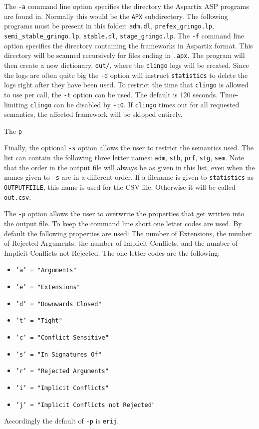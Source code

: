 \documentclass[parskip=half]{scrartcl}
\begin{document}
The \texttt{-a} command line option specifies the directory the Aspartix ASP
programs are found in. Normally this would be the \texttt{APX\/} subdirectory.
The following programs must be present in this folder: \texttt{adm.dl},
\texttt{prefex\_gringo.lp}, \texttt{semi\_stable\_gringo.lp},
\texttt{stable.dl}, \texttt{stage\_gringo.lp}.  The \texttt{-f} command line
option specifies the directory containing the frameworks in Aspartix format.
This directory will be scanned recursively for files ending
in \texttt{.apx}. The program will then create a new
dictionary, \texttt{out/}, where the \texttt{clingo} logs will be created.
Since the logs are often quite big the \texttt{-d} option will instruct
\texttt{statistics} to delete the logs right after they have been used.
To restrict the time that \texttt{clingo} is allowed to use per call, the
\texttt{-t} option can be used. The default is 120 seconds. Time-limiting
\texttt{clingo} can be disabled by \texttt{-t0}.
If \texttt{clingo} times out for all requested semantics, the affected
framework will be skipped entirely.

The \texttt{p}

Finally, the optional \texttt{-s} option allows the user to restrict the
semantics used. The list can contain the following three letter names:
\texttt{adm}, \texttt{stb}, \texttt{prf}, \texttt{stg}, \texttt{sem}. Note that
the order in the output file will always be as given in this list, even when the
names given to \texttt{-s} are in a different order. If a filename is given to
\texttt{statistics} as \texttt{OUTPUTFIILE}, this name is used for the CSV file.
Otherwise it will be called \texttt{out.csv}.

The \texttt{-p} option allows the user to overwrite the properties that
get written into the output file. To keep the command line short one
letter codes are used.
By default the following properties are used: The number
of Extensions, the number of Rejected Arguments, the number of Implicit
Conflicts, and the number of Implicit Conflicts not Rejected.
The one letter codes are the following:
\begin{itemize}
	\item \texttt{'a' = "Arguments"}
	\item \texttt{'e' = "Extensions"}
	\item \texttt{'d' = "Downwards Closed"}
	\item \texttt{'t' = "Tight"}
	\item \texttt{'c' = "Conflict Sensitive"}
	\item \texttt{'s' = "In Signatures Of"}
	\item \texttt{'r' = "Rejected Arguments"}
	\item \texttt{'i' = "Implicit Conflicts"}
	\item \texttt{'j' = "Implicit Conflicts not Rejected"}
\end{itemize}
Accordingly the default of \texttt{-p} is \texttt{erij}.
\end{document}
